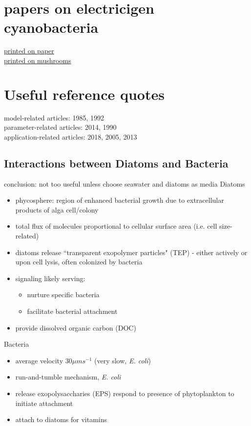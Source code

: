 \documentclass[a4paper,11pt]{article}
\begin{document}
    \section{papers on electricigen cyanobacteria}
    \href{https://www.nature.com/articles/s41467-017-01084-4/}{printed on paper}\\
    \href{sci-hub.se/10.1021/acs.nanolett.8b02642}{printed on mushrooms}
    
    \section{Useful reference quotes}
    model-related articles: 1985\autocite{bratbak1985phytoplankton}, 1992\autocite{sanders1992relationships}\\
    parameter-related articles: 2014\autocite{beliaev2014inference}, 1990\autocite{currie1990large}\\
    application-related articles: 2018\autocite{light2018flavin}, 2005\autocite{reguera2005extracellular}, 2013\autocite{xie2013microbial}

    \subsection{Interactions between Diatoms and Bacteria\autocite{amin2012interactions}}
    conclusion: not too useful unless choose seawater and diatoms as media
    Diatoms
    \begin{itemize}
        \item phycosphere: region of enhanced bacterial growth due to extracellular products of alga cell/colony
        \item total flux of molecules proportional to cellular surface area (i.e. cell size-related)
        \item diatoms release ``transparent exopolymer particles" (TEP) - either actively or upon cell lysis, often colonized by bacteria
        \item signaling likely serving:
        \begin{itemize}
            \item nurture specific bacteria
            \item facilitate bacterial attachment
        \end{itemize}
        \item provide dissolved organic carbon (DOC)
    \end{itemize}
    Bacteria
    \begin{itemize}
        \item average velocity 30$\mu ms^{-1}$ (very slow, \textit{E. coli})
        \item run-and-tumble mechanism, \textit{E. coli}
        \item release exopolysaccharies (EPS) respond to presence of phytoplankton to initiate attachment
        \item attach to diatoms for vitamins
    \end{itemize}
    
\end{document}
